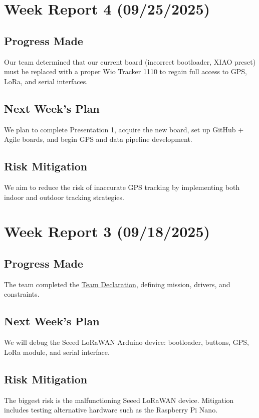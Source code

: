 \section{Week Report 4 (09/25/2025)}
\label{sec:report4}

\subsection{Progress Made}
Our team determined that our current board (incorrect bootloader, XIAO preset) must be replaced with a proper Wio Tracker 1110 to regain full access to GPS, LoRa, and serial interfaces.

\subsection{Next Week's Plan}
We plan to complete Presentation 1, acquire the new board, set up GitHub + Agile boards, and begin GPS and data pipeline development.

\subsection{Risk Mitigation}
We aim to reduce the risk of inaccurate GPS tracking by implementing both indoor and outdoor tracking strategies.


\section{Week Report 3 (09/18/2025)}
\label{sec:report3}

\subsection{Progress Made}
The team completed the \hyperref[Chapter::TeamDeclaration]{Team Declaration}, defining mission, drivers, and constraints.

\subsection{Next Week's Plan}
We will debug the Seeed LoRaWAN Arduino device: bootloader, buttons, GPS, LoRa module, and serial interface.

\subsection{Risk Mitigation}
The biggest risk is the malfunctioning Seeed LoRaWAN device. Mitigation includes testing alternative hardware such as the Raspberry Pi Nano.


